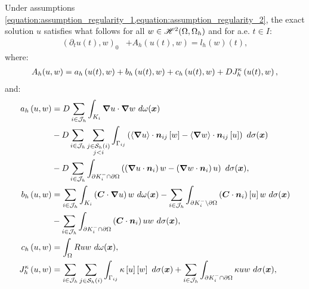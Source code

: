 Under assumptions \cref{equation:assumption_regularity_1,equation:assumption_regularity_2}, the exact solution $u$ satisfies what follows for all $w \in \mathscr{H}^{2}(\Omega, \Omega_h)$ and for a.e. $t \in I$:
\begin{align}
    \left( \partial_t u(t), w \right)_0 &+ A_h(u(t), w) = l_h \left( w \right) (t),
\end{align}
where:
\begin{align}
    A_h(u, w) = a_h \left( u(t), w \right) + b_h \left( u(t), w \right) + c_h \left( u(t), w \right) + D J^{\kappa}_h \left( u(t), w \right) \label{equation:cdr_Ah},
\end{align}
and:
\begin{align}
    a_h \left( u, w \right) &= \Diffusion \sum_{i \in \SpaceIndices} \int_{K_i} \Gradient u \cdot \Gradient w ~ d \omega(\Vektor{x}) \label{equation:cdr_ah} \\
    &- \Diffusion \sum_{i \in \SpaceIndices} \sum_{\substack{j \in \Neighbours{i} \\ j < i}} \int_{\Gamma_{ij}} \left( \left\langle \Gradient u \right\rangle \cdot \Vektor{n}_{ij} \left[ w \right] - \left\langle \Gradient w \right\rangle \cdot \Vektor{n}_{ij} \left[ u \right] \right) ~ d \sigma(\Vektor{x}) \notag \\
    &- \Diffusion \sum_{i \in \SpaceIndices} \int_{\partial K_i^- \cap \partial \Omega} \left( \left( \Gradient u \cdot \Vektor{n}_i \right) w - \left( \Gradient w \cdot \Vektor{n}_i \right) u \right) ~ d \sigma(\Vektor{x}), \notag \\
    b_h \left( u, w \right) &= \sum_{i \in \SpaceIndices} \int_{K_i} \left( \Convection \cdot \Gradient u \right) w ~ d \omega(\Vektor{x}) \label{equation:cdr_bh} - \sum_{i \in \SpaceIndices} \int_{\partial K_i^- \setminus \partial \Omega} \left( \Convection \cdot \Vektor{n}_i \right) \left[ u \right] w ~ d \sigma(\Vektor{x}) \\
    &- \sum_{i \in \SpaceIndices} \int_{\partial K_i^- \cap \partial \Omega} \left( \Convection \cdot \Vektor{n}_i \right) u w ~ d \sigma(\Vektor{x}), \notag \\
    c_h \left( u, w \right) &= \int_{\Omega} \Reaction u w ~ d \omega(\Vektor{x}), \label{equation:cdr_ch} \\
    J^{\kappa}_h \left( u, w \right) &= \sum_{i \in \SpaceIndices} \sum_{j \in \Neighbours{i}} \int_{\Gamma_{ij}} \kappa \left[ u \right] \left[ w \right] ~ d \sigma(\Vektor{x}) + \sum_{i \in \SpaceIndices} \int_{\partial K_i^- \cap \partial \Omega} \kappa u w ~ d \sigma(\Vektor{x}), \label{equation:cdr_jh} \\

\end{align}
